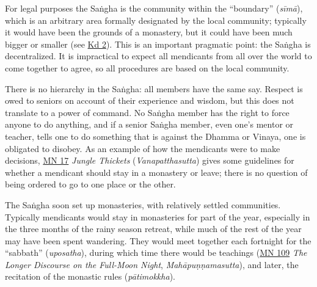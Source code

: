 \documentclass[12pt,openany]{book}%
\begin{document}
For legal purposes the \textsanskrit{Saṅgha} is the community within the “boundary” (\textit{\textsanskrit{sīmā}}), which is an arbitrary area formally designated by the local community; typically it would have been the grounds of a monastery, but it could have been much bigger or smaller (see \href{https://suttacentral.net/pli{-}tv{-}kd2}{Kd 2}). This is an important pragmatic point: the \textsanskrit{Saṅgha} is decentralized. It is impractical to expect all mendicants from all over the world to come together to agree, so all procedures are based on the local community.

There is no hierarchy in the \textsanskrit{Saṅgha}: all members have the same say. Respect is owed to seniors on account of their experience and wisdom, but this does not translate to a power of command. No \textsanskrit{Saṅgha} member has the right to force anyone to do anything, and if a senior \textsanskrit{Saṅgha} member, even one’s mentor or teacher, tells one to do something that is against the Dhamma or Vinaya, one is obligated to disobey. As an example of how the mendicants were to make decisions, \href{https://suttacentral.net/mn17}{MN 17} \textit{Jungle Thickets} (\textit{Vanapatthasutta}) gives some guidelines for whether a mendicant should stay in a monastery or leave; there is no question of being ordered to go to one place or the other.

The \textsanskrit{Saṅgha} soon set up monasteries, with relatively settled communities. Typically mendicants would stay in monasteries for part of the year, especially in the three months of the rainy season retreat, while much of the rest of the year may have been spent wandering. They would meet together each fortnight for the “sabbath” (\textit{uposatha}), during which time there would be teachings (\href{https://suttacentral.net/mn109}{MN 109} \textit{The Longer Discourse on the Full-Moon Night}, \textit{\textsanskrit{Mahāpuṇṇamasutta}}), and later, the recitation of the monastic rules (\textit{\textsanskrit{pātimokkha}}).
\end{document}
